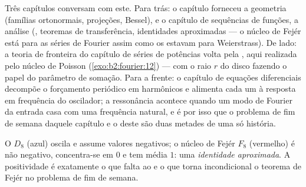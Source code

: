 \begin{remark}
Três capítulos conversam com este. Para trás: o capítulo 
forneceu a geometria (famílias ortonormais,
projeções, Bessel), e o capítulo de sequências de funções, a
análise (, teoremas de transferência, identidades
aproximadas --- o núcleo de Fejér está para as séries de Fourier assim como
os  estavam para Weierstrass). De lado: a
teoria de fronteira do capítulo de séries de potências volta pela , aqui realizada pelo núcleo de Poisson
(\cref{exo:b2:fourier:12}) --- com o raio $r$ do disco fazendo
o papel do parâmetro de somação. Para a frente: o
capítulo de equações diferenciais decompõe o forçamento periódico
em harmônicos e alimenta cada um à resposta em frequência do
oscilador; a ressonância acontece quando um modo de Fourier da entrada
casa com uma frequência natural, e é por isso que o problema de fim de semana
daquele capítulo e o deste são duas metades de uma só história.
\end{remark}

\begin{omfigure}

{\small O  $D_8$ (azul) oscila e assume
valores negativos; o núcleo de Fejér $F_8$ (vermelho) é não negativo,
concentra-se em $0$ e tem média $1$: uma \emph{identidade
aproximada}. A positividade é exatamente o que falta ao 
e o que torna incondicional o teorema de Fejér no problema de fim de
semana.}
\end{omfigure}

